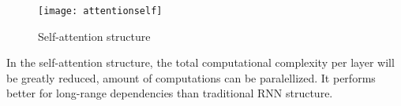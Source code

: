 \begin{figure}[h]
	\centering
	\texttt{[image: attentionself]}
	\caption{Self-attention structure}
\end{figure}

In the self-attention structure, the total computational complexity per layer will be greatly reduced, amount of computations can be paralellized. It performs better for long-range dependencies than traditional RNN structure.


%
%






